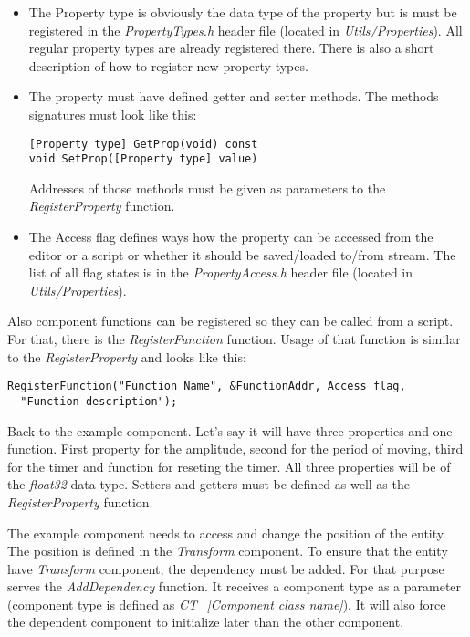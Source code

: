 \documentclass[a4paper, 12pt]{report}
\begin{document}
\begin{itemize}
\item
The Property type is obviously the data type of the property but is must be registered in the \emph{PropertyTypes.h} header file (located in \emph{Utils/Properties}). All regular property types are already registered there. There is also a short description of how to register new property types.

\item
The property must have defined getter and setter methods. The methods signatures must look like this:

\footnotesize 
\begin{verbatim}
[Property type] GetProp(void) const
void SetProp([Property type] value)
\end{verbatim}
\normalsize

Addresses of those methods must be given as parameters to the \emph{RegisterProperty} function.

\item
The Access flag defines ways how the property can be accessed from the editor or a script or whether it should be saved/loaded to/from stream. The list of all flag states is in the \emph{PropertyAccess.h} header file (located in \emph{Utils/Properties}).
\end{itemize}

Also component functions can be registered so they can be called from a script. For that, there is the \emph{RegisterFunction} function. Usage of that function is similar to the \emph{RegisterProperty} and looks like this:

\footnotesize 
\begin{verbatim}
RegisterFunction("Function Name", &FunctionAddr, Access flag,
  "Function description");
\end{verbatim}
\normalsize

Back to the example component. Let's say it will have three properties and one function. First property for the amplitude, second for the period of moving, third for the timer and function for reseting the timer. All three properties will be of the \emph{float32} data type. Setters and getters must be defined as well as the \emph{RegisterProperty} function. 

The example component needs to access and change the position of the entity. The position is defined in the \emph{Transform} component. To ensure that the entity have \emph{Transform} component, the dependency must be added. For that purpose serves the \emph{AddDependency} function. It receives a component type as a parameter (component type is defined as \emph{CT\_[Component class name]}). It will also force the dependent component to initialize later than the other component.
\end{document}
